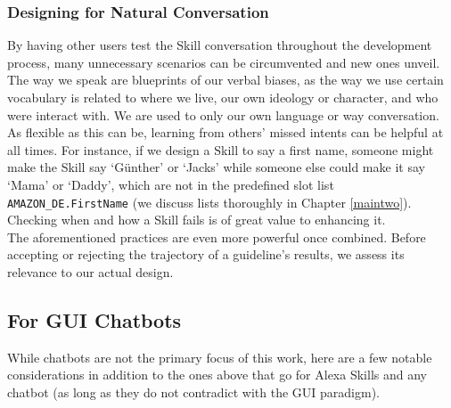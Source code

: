 \subsubsection*{Designing for Natural Conversation}
By having other users test the Skill conversation throughout the development process, many unnecessary scenarios can be circumvented and new ones unveil. The way we speak are blueprints of our verbal biases, as the way we use certain vocabulary is related to where we live, our own ideology or character, and who were interact with. We are used to only our own language or way conversation. As flexible as this can be, learning from others' missed intents can be helpful at all times. For instance, if we design a Skill to say a first name, someone might make the Skill say `Günther' or `Jacks' while someone else could make it say `Mama' or `Daddy', which are not in the predefined slot list \texttt{AMAZON_DE.FirstName} (we discuss lists thoroughly in Chapter \ref{maintwo}). Checking when and how a Skill fails is of great value to enhancing it.\\


The aforementioned practices are even more powerful once combined. Before accepting or rejecting the trajectory of a guideline's results, we assess its relevance to our actual design.






\subsection*{For GUI Chatbots}
\label{chatguide}




While chatbots are not the primary focus of this work, here are a few notable considerations in addition to the ones above that go for Alexa Skills and any chatbot (as long as they do not contradict with the GUI paradigm).




